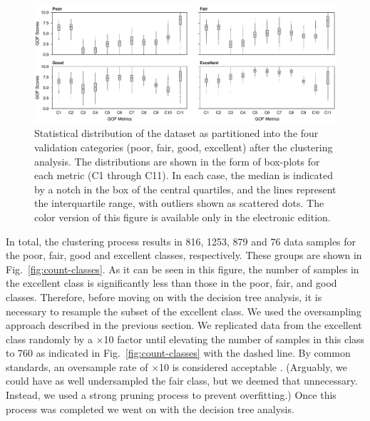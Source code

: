 \begin{figure}
	\centering
	\includegraphics[width=\textwidth]{figures/pdf/figure-06}
	\caption{Statistical distribution of the dataset as partitioned into the four validation categories (poor, fair, good, excellent) after the clustering analysis. The distributions are shown in the form of box-plots for each metric (C1 through C11). In each case, the median is indicated by a notch in the box of the central quartiles, and the lines represent the interquartile range, with outliers shown as scattered dots. The color version of this figure is available only in the electronic edition.}
	\label{fig:boxed-clusters}
\end{figure}

In total, the clustering process results in 816, 1253, 879 and 76 data samples for the poor, fair, good and excellent classes, respectively. These groups are shown in Fig.~\ref{fig:count-classes}. As it can be seen in this figure, the number of samples in the excellent class is significantly less than those in the poor, fair, and good classes. Therefore, before moving on with the decision tree analysis, it is necessary to resample the subset of the excellent class. We used the oversampling approach described in the previous section. We replicated data from the excellent class randomly by a $\times$10 factor until elevating the number of samples in this class to 760 as indicated in Fig.~\ref{fig:count-classes} with the dashed line. By common standards, an oversample rate of $\times$10 is considered acceptable \citep{Weiss_2003_JAIR}. (Arguably, we could have as well undersampled the fair class, but we deemed that unnecessary. Instead, we used a strong pruning process to prevent overfitting.) Once this process was completed we went on with the decision tree analysis. 

